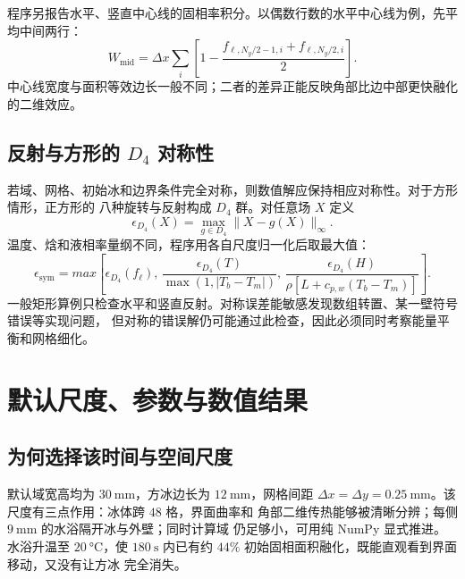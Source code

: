 \documentclass[UTF8,11pt]{ctexart}
\numberwithin{equation}{section}
\newcommand{\fl}{f_{\ell}}
\begin{document}
程序另报告水平、竖直中心线的固相率积分。以偶数行数的水平中心线为例，先平均中间两行：
\begin{equation}
      W_{\mathrm{mid}}
      =\Delta x\sum_i
      \left[1-\frac{f_{\ell,N_y/2-1,i}+f_{\ell,N_y/2,i}}{2}\right].
      \label{eq:midline-width}
\end{equation}
中心线宽度与面积等效边长一般不同；二者的差异正能反映角部比边中部更快融化的二维效应。

\subsection{反射与方形的 \texorpdfstring{$D_4$}{D4} 对称性}

若域、网格、初始冰和边界条件完全对称，则数值解应保持相应对称性。对于方形情形，正方形的
八种旋转与反射构成 $D_4$ 群。对任意场 $X$ 定义
\begin{equation}
      \epsilon_{D_4}(X)
      =\max_{g\in D_4}\lVert X-g(X)\rVert_{\infty}.
      \label{eq:d4-error}
\end{equation}
温度、焓和液相率量纲不同，程序用各自尺度归一化后取最大值：
\begin{equation}
      \epsilon_{\mathrm{sym}}=max\left[
      \epsilon_{D_4}(\fl),\,
      \frac{\epsilon_{D_4}(T)}{\max(1,|T_b-T_m|)},\,
      \frac{\epsilon_{D_4}(H)}
      {\rho[L+c_{p,w}(T_b-T_m)]}
      \right].
      \label{eq:normalized-symmetry}
\end{equation}
一般矩形算例只检查水平和竖直反射。对称误差能敏感发现数组转置、某一壁符号错误等实现问题，
但对称的错误解仍可能通过此检查，因此必须同时考察能量平衡和网格细化。

\section{默认尺度、参数与数值结果}

\subsection{为何选择该时间与空间尺度}

默认域宽高均为 $\SI{30}{\milli\metre}$，方冰边长为 $\SI{12}{\milli\metre}$，网格间距
$\Delta x=\Delta y=\SI{0.25}{\milli\metre}$。该尺度有三点作用：冰体跨 $48$ 格，界面曲率和
角部二维传热能够被清晰分辨；每侧 $\SI{9}{\milli\metre}$ 的水浴隔开冰与外壁；同时计算域
仍足够小，可用纯 NumPy 显式推进。水浴升温至 $\SI{20}{\degreeCelsius}$，使
$\SI{180}{\second}$ 内已有约 $44\%$ 初始固相面积融化，既能直观看到界面移动，又没有让方冰
完全消失。
\end{document}
